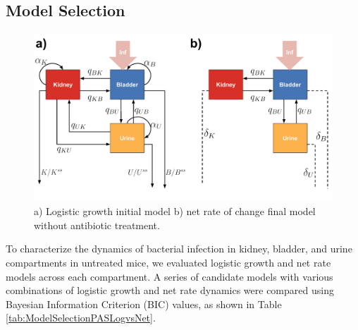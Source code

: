 \documentclass{article}
\begin{document}

\subsection{Model Selection}

\begin{figure}
	\centering
	\includegraphics[width=0.8\linewidth]{images/draw_Anoruti_Models_schema.pdf}
	\caption{a) Logistic growth initial model b) net rate of change final model without antibiotic treatment. }
	\label{fig:ModelOnelineNOATB}
\end{figure}


To characterize the dynamics of bacterial infection in kidney, bladder, and urine compartments in untreated mice, we evaluated logistic growth and net rate models across each compartment. A series of candidate models with various combinations of logistic growth and net rate dynamics were compared using Bayesian Information Criterion (BIC) values, as shown in Table \ref{tab:ModelSelectionPASLogvsNet}.



\end{document}
